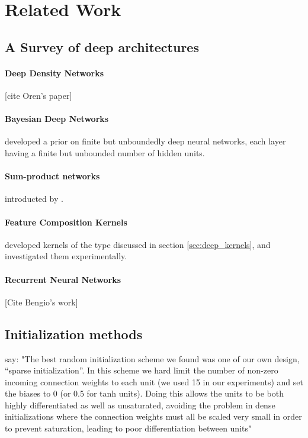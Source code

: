 \documentclass{article}
\begin{document}
\section{Related Work}

\subsection{A Survey of deep architectures}

\paragraph{Deep Density Networks} 
[cite Oren's paper]

\paragraph{Bayesian Deep Networks} \cite{adams2010learning} developed a prior on finite but unboundedly deep neural networks, each layer having a finite but unbounded number of hidden units.

\paragraph{Sum-product networks} introducted by \cite{poon2011sum}.

\paragraph{Feature Composition Kernels} \cite{cho2012kernel} developed kernels of the type discussed in section \ref{sec:deep_kernels}, and investigated them experimentally.

\paragraph{Recurrent Neural Networks}
[Cite Bengio's work]


\subsection{Initialization methods}

\cite{martens2010deep} say:  "The best random initialization scheme we found was one of our own design,
“sparse initialization”. In this scheme we hard limit the
number of non-zero incoming connection weights to each
unit (we used 15 in our experiments) and set the biases to
0 (or 0.5 for tanh units). Doing this allows the units to be
both highly differentiated as well as unsaturated, avoiding
the problem in dense initializations where the connection
weights must all be scaled very small in order to prevent
saturation, leading to poor differentiation between units"
\end{document}
